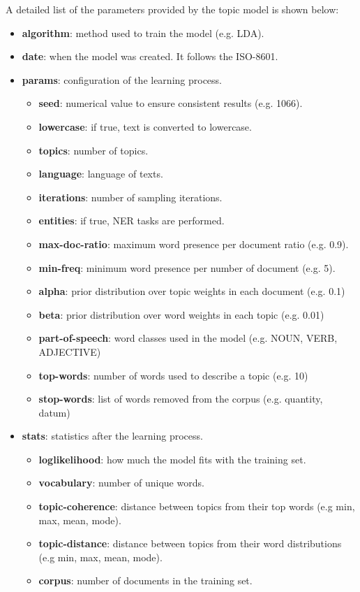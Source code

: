 A detailed list of the parameters provided by the topic model is shown below:
\begin{itemize}
\item \textbf{algorithm}: method used to train the model (e.g. LDA).
\item \textbf{date}: when the model was created. It follows the ISO-8601.
\item \textbf{params}: configuration of the learning process.
	\begin{itemize}
	\item \textbf{seed}: numerical value to ensure consistent results (e.g. 1066).
	\item \textbf{lowercase}: if true, text is converted to lowercase.
	\item \textbf{topics}: number of topics.
	\item \textbf{language}: language of texts.
	\item \textbf{iterations}: number of sampling iterations.
	\item \textbf{entities}: if true, NER tasks are performed.
	\item \textbf{max-doc-ratio}: maximum word presence per document ratio (e.g. 0.9).
	\item \textbf{min-freq}: minimum word presence per number of document (e.g. 5). 
	\item \textbf{alpha}: prior distribution over topic weights in each document (e.g. 0.1)
	\item \textbf{beta}: prior distribution over word weights in each topic (e.g. 0.01)
	\item \textbf{part-of-speech}: word classes used in the model (e.g. NOUN, VERB, ADJECTIVE)
	\item \textbf{top-words}: number of words used to describe a topic (e.g. 10)
	\item \textbf{stop-words}: list of words removed from the corpus (e.g. quantity, datum) 
	\end{itemize}
\item \textbf{stats}: statistics after the learning process.
	\begin{itemize}
	\item \textbf{loglikelihood}: how much the model fits with the training set.
	\item \textbf{vocabulary}: number of unique words.
	\item \textbf{topic-coherence}: distance between topics from their top words (e.g min, max, mean, mode).
	\item \textbf{topic-distance}: distance between topics from their word distributions (e.g min, max, mean, mode).
	\item \textbf{corpus}: number of documents in the training set. 
	\end{itemize}
\end{itemize}


